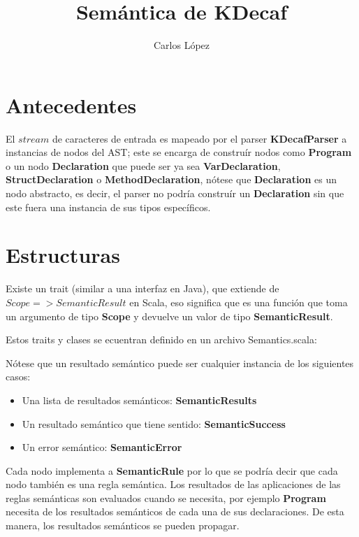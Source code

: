 \documentclass[12pt,letterpaper]{article}
\author{Carlos L\'{o}pez}
\title{Semántica de KDecaf}
\begin{document}
\maketitle

\section{Antecedentes}

El $stream$ de caracteres de entrada es mapeado por el parser \textbf{KDecafParser} a instancias de nodos del AST; este se encarga de construír nodos como \textbf{Program} o un nodo \textbf{Declaration} que puede ser ya sea \textbf{VarDeclaration}, \textbf{StructDeclaration} o \textbf{MethodDeclaration}, n\'{o}tese que \textbf{Declaration} es un nodo abstracto, es decir, el parser no podría construír un \textbf{Declaration} sin que este fuera una instancia de sus tipos espec\'{i}ficos.

\section{Estructuras}

Existe un trait (similar a una interfaz en Java), que extiende de \textbf{$Scope => SemanticResult$} en Scala, eso significa que es una funci\'{o}n que toma un argumento de tipo \textbf{Scope} y devuelve un valor de tipo \textbf{SemanticResult}.

Estos traits y clases se ecuentran definido en un archivo Semantics.scala:



Nótese que un resultado semántico puede ser cualquier instancia de los siguientes casos:

\begin{itemize}
  \item Una lista de resultados semánticos: \textbf{SemanticResults}
  \item Un resultado semántico que tiene sentido: \textbf{SemanticSuccess}
  \item Un error semántico: \textbf{SemanticError}
\end{itemize}

Cada nodo implementa a \textbf{SemanticRule} por lo que se podr\'{i}a decir que cada nodo tambi\'{e}n es una regla sem\'{a}ntica. Los resultados de las aplicaciones de las reglas semánticas son evaluados cuando se necesita, por ejemplo \textbf{Program} necesita de los resultados semánticos de cada una de sus declaraciones. De esta manera, los resultados semánticos se pueden propagar.
\end{document}
